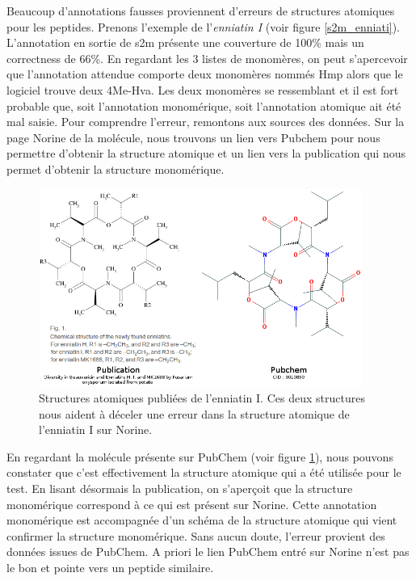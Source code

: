 Beaucoup d'annotations fausses proviennent d'erreurs de structures atomiques pour les peptides.
Prenons l'exemple de l'\textit{enniatin I} (voir figure \ref{s2m_enniati}).
L'annotation en sortie de s2m présente une couverture de 100\% mais un correctness de 66\%.
En regardant les 3 listes de monomères, on peut s'apercevoir que l'annotation attendue comporte deux monomères nommés Hmp alors que le logiciel trouve deux 4Me-Hva.
Les deux monomères se ressemblant et il est fort probable que, soit l'annotation monomérique, soit l'annotation atomique ait été mal saisie.
Pour comprendre l'erreur, remontons aux sources des données.
Sur la page Norine de la molécule, nous trouvons un lien vers Pubchem pour nous permettre d'obtenir la structure atomique et un lien vers la publication qui nous permet d'obtenir la structure monomérique.

\begin{figure}[h!]
  \begin{center}
    \includegraphics[width=400px]{Figures/s2m/results/enniatinI_corrections.png}
    \caption{\label{enni_cor}Structures atomiques publiées de l'enniatin I.
    Ces deux structures nous aident à déceler une erreur dans la structure atomique de l'enniatin I sur Norine.}
  \end{center}
\end{figure}

En regardant la molécule présente sur PubChem (voir figure \ref{enni_cor}), nous pouvons constater que c'est effectivement la structure atomique qui a été utilisée pour le test.
En lisant désormais la publication\cite{song_diversity_2008}, on s'aperçoit que la structure monomérique correspond à ce qui est présent sur Norine.
Cette annotation monomérique est accompagnée d'un schéma de la structure atomique qui vient confirmer la structure monomérique.
Sans aucun doute, l'erreur provient des données issues de PubChem.
A priori le lien PubChem entré sur Norine n'est pas le bon et pointe vers un peptide similaire.


